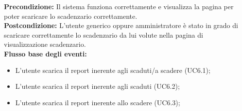 \textbf{Precondizione:}  Il sistema funziona correttamente e visualizza la pagina per poter scaricare lo scadenzario correttamente. \\

\textbf{Postcondizione:} L’utente generico oppure amministratore è stato in grado di scaricare correttamente lo scadenzario da lui volute nella pagina di visualizzazione scadenzario.  \\


\textbf{Flusso base degli eventi:} 

\begin{itemize}

\item L’utente scarica il report inerente agli scaduti/a scadere (UC6.1);
\item L’utente scarica il report inerente agli scaduti  (UC6.2);
\item L’utente scarica il report inerente allo scadere (UC6.3);


\end{itemize}


